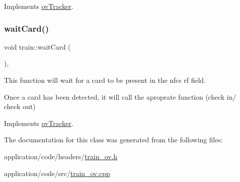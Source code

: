 Implements \hyperlink{classovTracker_a793048db1b73e4e36a0cf11839048f73}{ov\+Tracker}.

\mbox{\label{classtrain_a4509fc35ff69717aab2636dd847981d4}} 
\subsubsection{\texorpdfstring{wait\+Card()}{waitCard()}}
{\footnotesize\ttfamily void train\+::wait\+Card (\begin{DoxyParamCaption}{ }\end{DoxyParamCaption})\hspace{0.3cm}{\ttfamily [override]}, {\ttfamily [virtual]}}



This function will wait for a card to be present in the nfc\textquotesingle{}s rf field. 

Once a card has been detected, it will call the aproprate function (check in/ check out) 

Implements \hyperlink{classovTracker_a43dea6c5e524377f2190e59a7da85b51}{ov\+Tracker}.



The documentation for this class was generated from the following files\+:\begin{DoxyCompactItemize}
\item 
application/code/headers/\hyperlink{train__ov_8h}{train\+\_\+ov.\+h}\item 
application/code/src/\hyperlink{train__ov_8cpp}{train\+\_\+ov.\+cpp}\end{DoxyCompactItemize}
